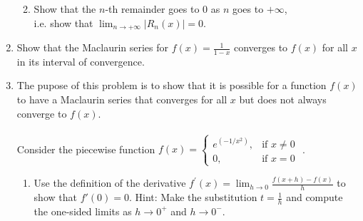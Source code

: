 \documentclass[12pt]{article}
\newif\ifans
\begin{document}
\begin{enumerate}
\begin{enumerate}
\ifans{\fbox{$(-\infty, +\infty)$.  See \underline{Power Series} \#15.}} \fi

\item Show that the $n$-th remainder goes to $0$ as $n$ goes to $+\infty$, \\ i.e. show that $\lim_{n \to +\infty}{|R_n(x)|=0}$.

\ifans{\fbox{\parbox{1\linewidth}{If $f(x)=\cos(x)$, then $|f^{(n+1)}(x)| \leq 1$ for all $n$ and for all $x$. 
\\ \\ So by the Remainder Estimation Theorem, $\textstyle 0 \leq |R_n(x)| \leq \frac{1}{(n+1)!} |x|^{n+1}$.
\\ \\ Now $\lim_{n \to +\infty}{0} = \lim_{n \to +\infty}{ \frac{1}{(n+1)!} |x|^{n+1}} = 0$.
\\ \\ So by the Squeeze Theorem $\lim_{n \to +\infty}{|R_n(x)|=0}$      }}} \fi

\end{enumerate}

\item Show that the Maclaurin series for $\textstyle f(x)=\frac{1}{1-x}$ converges to $f(x)$ for all $x$ in its interval of convergence.

\ifans{\fbox{\parbox{1\linewidth}{The Maclaurin series for $\textstyle f(x)=\frac{1}{1-x}$ is $\textstyle 1+x+x^2+x^3+x^4+\ldots = \sum_{k=0}^{\infty}{x^k}$, which is a geometric series with
$a=1$ and $r=x$.  Thus the series converges if, and only if, $-1 < x < 1$.  For these values of $x$, the series converges to $\textstyle \frac{a}{1-r}=\frac{1}{1-x}=f(x)$. }}} \fi

\item The pupose of this problem is to show that it is possible for a function $f(x)$ to have a Maclaurin series that converges for all $x$ but does not always converge to $f(x)$.
\\ \\ Consider the piecewise function $f(x) = \begin{cases} 
e^{(-1/x^2)}, & \text{if } x \neq 0 \\
0, & \text{if } x = 0 \end{cases}$ .

\begin{enumerate}

\item Use the definition of the derivative $f^{\prime}(x)=\lim_{h \to 0}{\tfrac{f(x+h)-f(x)}{h}}$ to show that $f'(0)=0$.  Hint:  Make the substitution $\textstyle t=\frac{1}{h}$ and compute the one-sided limits as $h \to 0^+$ and $h \to 0^-$.


\end{enumerate}
\end{enumerate}
\end{document}
